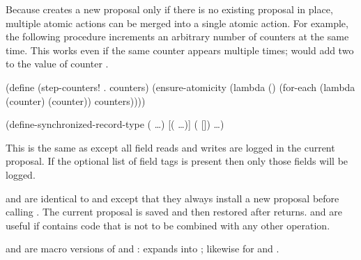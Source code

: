 Because  creates a new proposal only if there is
 no existing proposal in place, multiple atomic actions can be merged
 into a single atomic action.
For example, the following procedure increments an arbitrary number of
 counters at the same time.
This works even if the same counter appears multiple times;
  would add two to the value of counter .
\begin{example}
(define (step-counters! . counters)
  (ensure-atomicity
    (lambda ()
      (for-each (lambda (counter)
                  (counter))
                counters))))
\end{example}

\begin{example}
(define-synchronized-record-type  
  (  \ldots)
  [(\cvar {} \ldots)]
  (  [])
  \ldots)
\end{example}
This is the same as 
 except all field reads and
 writes are logged in the current proposal.
If the optional list of field tags is present then only those fields will
 be logged.

\begin{protos}
\end{protos}
\noindent
{} and  are identical
 to  and  except that they
 always install a new proposal before calling .
The current proposal is saved and then restored after  returns.
 and  are useful if  contains
 code that is not to be combined with any other operation.

 and  are macro versions of
 and :
 expands into
; likewise for
 and .


